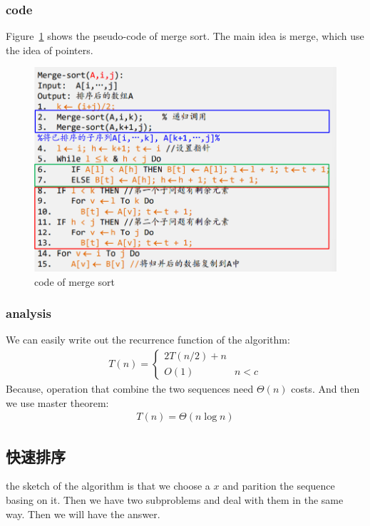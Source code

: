 \documentclass[a4paper, 10pt]{ctexart} %
\begin{document}
\subsubsection{code}
Figure~\ref{fig:merge1} shows the pseudo-code of merge sort. The main idea 
is merge, which use the idea of pointers.
\begin{figure}[]
    \centering
    \includegraphics[scale = 0.5]{merge1.png}
    \caption{code of merge sort}
    \label{fig:merge1}
\end{figure}
\subsubsection{analysis}
We can easily write out the recurrence function of the 
algorithm: 
\begin{align*}
    T \left( n\right)  = 
    \begin{cases}
        2  T(  n / 2) + n & \\
        O\left(1\right) & n< c
    \end{cases}
\end{align*}
Because, operation that combine the two sequences need 
$\Theta \left( n\right)$ costs. And then we use master theorem:
\begin{align*}
T \left( n\right)  =  \Theta \left( n \log n\right)
\end{align*}
\subsection{快速排序}
the sketch of the algorithm is that 
we choose a $x$ and parition the sequence 
basing on it. 
Then we have two subproblems and deal with them 
in the same way. Then we will have the answer.
\end{document}
